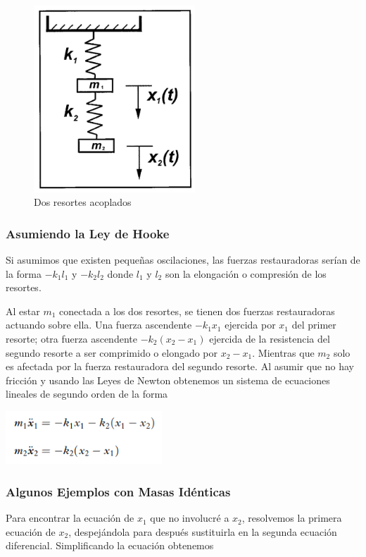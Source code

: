 \documentclass{article}
\begin{document}
	\begin{figure}
    \centering
    \includegraphics[height=7cm]{2spring.png}
    \caption{Dos resortes acoplados}
    \end{figure}

\subsubsection{Asumiendo la Ley de Hooke}
Si asumimos que existen pequeñas oscilaciones, las fuerzas restauradoras serían de la forma $-k_1l_1$ y $-k_2l_2$ donde $l_1$ y $l_2$ son la elongación o compresión de los resortes. 

Al estar $m_1$ conectada a los dos resortes, se tienen dos fuerzas restauradoras actuando sobre ella. Una fuerza ascendente $-k_1x_1$ ejercida por $x_1$ del primer resorte; otra fuerza ascendente $-k_2(x_2-x_1)$  ejercida de la resistencia del segundo resorte a ser comprimido o elongado por $x_2 - x_1$. Mientras que $m_2$ solo es afectada por la fuerza restauradora del segundo resorte. Al asumir que no hay fricción y usando las Leyes de Newton obtenemos un sistema de ecuaciones lineales de segundo orden de la forma

	\begin{center}
    \includegraphics[height=2cm]{ec2_1.png}
    \end{center}

\subsubsection{Algunos Ejemplos con Masas Idénticas}
Para encontrar la ecuación de $x_1$ que no involucré a $x_2$, resolvemos la primera ecuación de $x_2$, despejándola para después sustituirla en la segunda ecuación diferencial. Simplificando la ecuación obtenemos 
\end{document}

